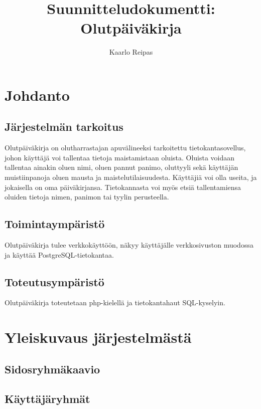 \documentclass[12pt]{amsart}
\title{Suunnitteludokumentti: Olutpäiväkirja}
\author{Kaarlo Reipas}
\begin{document}
\maketitle

\sloppy

\section{Johdanto}
\label{sec:johdanto}

\subsection{Järjestelmän tarkoitus}

Olutpäiväkirja on olutharrastajan apuvälineeksi tarkoitettu tietokantasovellus, johon käyttäjä voi tallentaa tietoja maistamistaan oluista. Oluista voidaan tallentaa ainakin oluen nimi, oluen pannut panimo, oluttyyli sekä käyttäjän muistiinpanoja oluen mausta ja maistelutilaisuudesta. Käyttäjiä voi olla useita, ja jokaisella on oma päiväkirjansa. Tietokannasta voi myös etsiä tallentamiensa oluiden tietoja nimen, panimon tai tyylin perusteella.

\subsection{Toimintaympäristö}

Olutpäiväkirja tulee verkkokäyttöön, näkyy käyttäjälle verkkosivuston muodossa ja käyttää PostgreSQL-tietokantaa.

\subsection{Toteutusympäristö}

Olutpäiväkirja toteutetaan php-kielellä ja tietokantahaut SQL-kyselyin.

\section{Yleiskuvaus järjestelmästä}

\subsection{Sidosryhmäkaavio}

\subsection{Käyttäjäryhmät}
\end{document}
